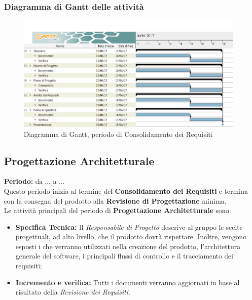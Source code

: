 	\subsubsection{Diagramma di Gantt delle attività}
	\begin{figure}[H]
		\centering
		\includegraphics[width=1\linewidth]{immagini/gantt/consolidamento_requisiti.png}
		\caption{Diagramma di Gantt, periodo di Consolidamento dei Requisiti}
	\end{figure}
	\subsection{Progettazione Architetturale}
	\textbf{Periodo:} da ... a ... \\
	Questo periodo inizia al termine del \textbf{Consolidamento dei Requisiti} e termina con la consegna del prodotto alla \textbf{Revisione di Progettazione} minima. \\
	Le attività principali del periodo di \textbf{Progettazione Architetturale} sono: \\
	\begin{itemize}
		\item \textbf{Specifica Tecnica:} Il \textit{Responsabile di Progetto} descrive al gruppo le scelte progettuali, ad alto livello, che il prodotto dovrà rispettare. Inoltre, vengono esposti i  che verranno utilizzati nella creazione del prodotto, l'architettura generale del software, i principali flussi di controllo e il tracciamento dei requisiti;
		\item \textbf{Incremento e verifica:} Tutti i documenti verranno aggiornati in base al risultato
della \textit{Revisione dei Requisiti}. \\
	\end{itemize}
